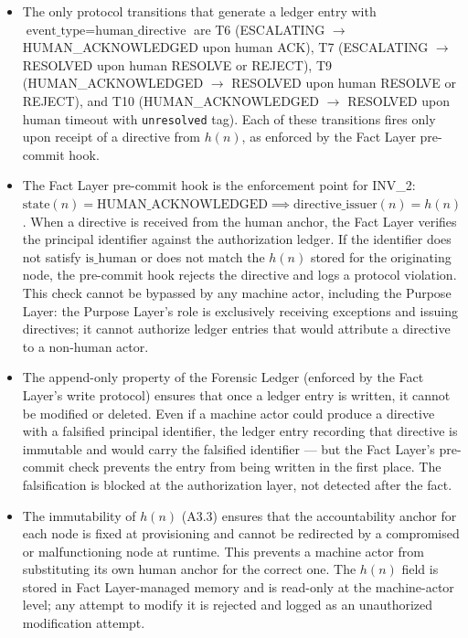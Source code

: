 \begin{itemize}
\item[\textbf{Step 1.}] The only protocol transitions that generate a ledger entry with $\text{event\_type} = \text{human\_directive}$ are T6 (ESCALATING $\rightarrow$ HUMAN\_ACKNOWLEDGED upon human ACK), T7 (ESCALATING $\rightarrow$ RESOLVED upon human RESOLVE or REJECT), T9 (HUMAN\_ACKNOWLEDGED $\rightarrow$ RESOLVED upon human RESOLVE or REJECT), and T10 (HUMAN\_ACKNOWLEDGED $\rightarrow$ RESOLVED upon human timeout with \texttt{unresolved} tag). Each of these transitions fires only upon receipt of a directive from $h(n)$, as enforced by the Fact Layer pre-commit hook.

\item[\textbf{Step 2.}] The Fact Layer pre-commit hook is the enforcement point for INV\_2: $\text{state}(n) = \text{HUMAN\_ACKNOWLEDGED} \implies \text{directive\_issuer}(n) = h(n)$. When a directive is received from the human anchor, the Fact Layer verifies the principal identifier against the authorization ledger. If the identifier does not satisfy $\text{is\_human}$ or does not match the $h(n)$ stored for the originating node, the pre-commit hook rejects the directive and logs a protocol violation. This check cannot be bypassed by any machine actor, including the Purpose Layer: the Purpose Layer's role is exclusively receiving exceptions and issuing directives; it cannot authorize ledger entries that would attribute a directive to a non-human actor.

\item[\textbf{Step 3.}] The append-only property of the Forensic Ledger (enforced by the Fact Layer's write protocol) ensures that once a ledger entry is written, it cannot be modified or deleted. Even if a machine actor could produce a directive with a falsified principal identifier, the ledger entry recording that directive is immutable and would carry the falsified identifier — but the Fact Layer's pre-commit check prevents the entry from being written in the first place. The falsification is blocked at the authorization layer, not detected after the fact.

\item[\textbf{Step 4.}] The immutability of $h(n)$ (A3.3) ensures that the accountability anchor for each node is fixed at provisioning and cannot be redirected by a compromised or malfunctioning node at runtime. This prevents a machine actor from substituting its own human anchor for the correct one. The $h(n)$ field is stored in Fact Layer-managed memory and is read-only at the machine-actor level; any attempt to modify it is rejected and logged as an unauthorized modification attempt.
\end{itemize}

